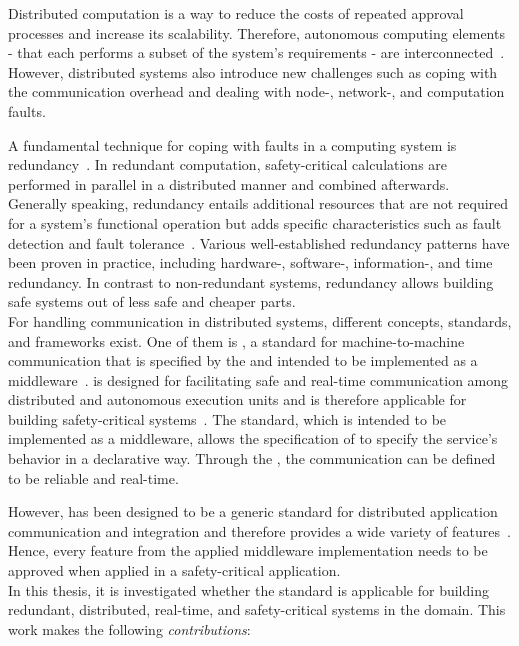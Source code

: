 Distributed computation is a way to reduce the costs of repeated approval processes and increase its scalability.
Therefore, autonomous computing elements - that each performs a subset of the system's requirements - are interconnected~\cite{DistributedSafety2020}.
However, distributed systems also introduce new challenges such as coping with the communication overhead and dealing with node-, network-, and computation faults.

A fundamental technique for coping with faults in a computing system is redundancy~\cite{TanenbaumSteen07}.
In redundant computation, safety-critical calculations are performed in parallel in a distributed manner and combined afterwards.
Generally speaking, redundancy entails additional resources that are not required for a system's functional operation but adds specific characteristics such as fault detection and fault tolerance~\cite{BarryFaultToleranceAnalysis}.
Various well-established redundancy patterns have been proven in practice, including hardware-, software-, information-, and time redundancy.
In contrast to non-redundant systems, redundancy allows building safe systems out of less safe and cheaper parts.
\\

For handling communication in distributed systems, different concepts, standards, and frameworks exist.
One of them is , a  standard for machine-to-machine communication that is specified by the  and intended to be implemented as a middleware~\cite{omgDDSspec}.
 is designed for facilitating safe and real-time communication among distributed and autonomous execution units and is therefore applicable for building safety-critical systems~\cite{DistributedSafety2020}.
The standard, which is intended to be implemented as a middleware, allows the specification of  to specify the service's behavior in a declarative way.
Through the , the communication can be defined to be reliable and real-time.

However,  has been designed to be a generic standard for distributed application communication and integration and therefore provides a wide variety of features~\cite{omgDDSspec}.
Hence, every feature from the applied middleware implementation needs to be approved when applied in a safety-critical application.
\\

In this thesis, it is investigated whether the  standard is applicable for building redundant, distributed, real-time, and safety-critical systems in the  domain.
This work makes the following \textit{contributions}:

